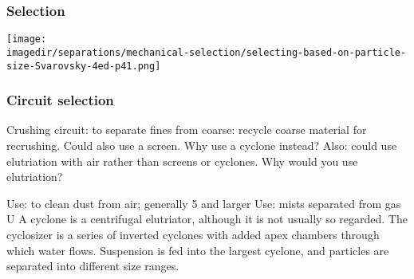 \begin{frame}\frametitle{Selection}
	\begin{center}
		\texttt{[image: \\imagedir/separations/mechanical-selection/selecting-based-on-particle-size-Svarovsky-4ed-p41.png]}
	\end{center}
\end{frame}

\begin{frame}\frametitle{Circuit selection}
	Crushing circuit: to separate fines from coarse: recycle coarse material for recrushing. Could also use a screen. Why use a cyclone instead?
	Also: could use elutriation with air rather than screens or cyclones. Why would you use elutriation?

	Use: to clean dust from air; generally 5 \micron and larger
	Use: mists separated from gas
	U
	A cyclone is a centrifugal elutriator, although it is not usually so regarded. The cyclosizer is a series of inverted cyclones with added apex chambers through which water flows. Suspension is fed into the largest cyclone, and particles are separated into different size ranges.	
\end{frame}
